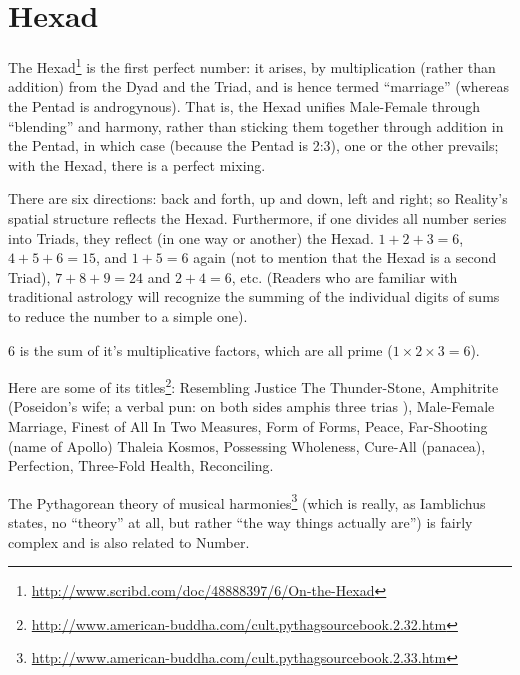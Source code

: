 \section{Hexad}

The Hexad\footnote{\url{http://www.scribd.com/doc/48888397/6/On-the-Hexad}} is the first perfect number: it arises, by multiplication (rather than addition) from the Dyad and the Triad, and is hence termed ``marriage'' (whereas the Pentad is androgynous). That is, the Hexad unifies Male-Female through ``blending'' and harmony, rather than sticking them together through addition in the Pentad, in which case (because the Pentad is 2:3), one or the other prevails; with the Hexad, there is a perfect mixing.

There are six directions: back and forth, up and down, left and right; so Reality's spatial structure reflects the Hexad. Furthermore, if one divides all number series into Triads, they reflect (in one way or another) the Hexad. $1+2+3=6$, $4+5+6 = 15$, and $1+5 = 6$ again (not to mention that the Hexad is a second Triad), $7+8+9= 24$ and $2+4=6$, etc. (Readers who are familiar with traditional astrology will recognize the summing of the individual digits of sums to reduce the number to a simple one).

6 is the sum of it's multiplicative factors, which are all prime ($1\times 2\times 3=6$).

Here are some of its titles\footnote{\url{http://www.american-buddha.com/cult.pythagsourcebook.2.32.htm}}: Resembling Justice The Thunder-Stone, Amphitrite (Poseidon's wife; a verbal pun: on both sides amphis three trias ), Male-Female Marriage, Finest of All In Two Measures, Form of Forms, Peace, Far-Shooting (name of Apollo) Thaleia Kosmos, Possessing Wholeness, Cure-All (panacea), Perfection, Three-Fold Health, Reconciling.

The Pythagorean theory of musical harmonies\footnote{\url{http://www.american-buddha.com/cult.pythagsourcebook.2.33.htm}} (which is really, as Iamblichus states, no ``theory'' at all, but rather ``the way things actually are'') is fairly complex and is also related to Number.

